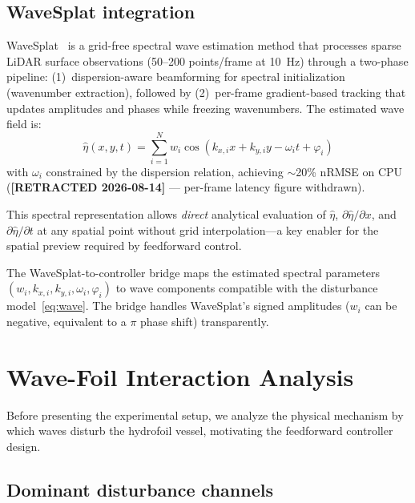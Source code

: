 \documentclass[review]{elsarticle}
\begin{document}
\subsection{WaveSplat integration}

WaveSplat~\citep{park2026wavesplat} is a grid-free spectral wave
estimation method that processes sparse LiDAR surface observations
(50--200 points/frame at 10~Hz) through a two-phase pipeline:
(1)~dispersion-aware beamforming for spectral initialization
(wavenumber extraction), followed by
(2)~per-frame gradient-based tracking that updates amplitudes and
phases while freezing wavenumbers.
The estimated wave field is:
\begin{equation}
  \hat{\eta}(x,y,t) = \sum_{i=1}^{N} w_i \cos(k_{x,i} x + k_{y,i} y - \omega_i t + \varphi_i)
\end{equation}
with $\omega_i$ constrained by the dispersion relation, achieving
$\sim$20\% nRMSE on CPU
(\textbf{[RETRACTED 2026-08-14]} --- per-frame latency figure withdrawn).

This spectral representation allows \emph{direct} analytical evaluation of
$\hat{\eta}$, $\partial\hat{\eta}/\partial x$, and
$\partial\hat{\eta}/\partial t$ at any spatial point without
grid interpolation---a key enabler for the spatial
preview required by feedforward control.

The WaveSplat-to-controller bridge maps the estimated spectral
parameters $(w_i, k_{x,i}, k_{y,i}, \omega_i, \varphi_i)$ to
wave components compatible with the disturbance model~\eqref{eq:wave}.
The bridge handles WaveSplat's signed amplitudes ($w_i$ can be
negative, equivalent to a $\pi$ phase shift) transparently.

\section{Wave-Foil Interaction Analysis}
\label{sec:wavefoi}

Before presenting the experimental setup, we analyze the physical
mechanism by which waves disturb the hydrofoil vessel, motivating the
feedforward controller design.

\subsection{Dominant disturbance channels}
\end{document}
